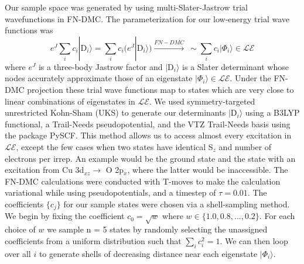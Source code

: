 \documentclass[12pt]{article}
\begin{document}
Our sample space was generated by using multi-Slater-Jastrow trial wavefunctions in FN-DMC.
The parameterization for our low-energy trial wave functions was
\begin{equation}
e^{J}\sum_{i} c_i|\text{D}_i\rangle = \sum_{i} c_i (e^J |\text{D}_i \rangle) \xrightarrow{FN-DMC} \ \sim \sum_i c_i |\Phi_i \rangle \in \mathcal{LE}
\label{eq:sampling}
\end{equation}
where $e^J$ is a three-body Jastrow factor and $|\text{D}_i\rangle$ is a Slater determinant whose nodes accurately approximate those of an eigenstate $|\Phi_i \rangle \in \mathcal{LE}$.
Under the FN-DMC projection these trial wave functions map to states which are very close to linear combinations of eigenstates in $\mathcal{LE}$.
We used symmetry-targeted unrestricted Kohn-Sham (UKS) to generate our determinants $|\text{D}_i\rangle$ using a B3LYP functional, a Trail-Needs pseudopotential, and the VTZ Trail-Needs basis using the package PySCF.
This method allows us to access almost every excitation in $\mathcal{LE}$, except the few cases when two states have identical S$_z$ and number of electrons per irrep.
An example would be the ground state and the state with an excitation from Cu 3d$_{xz} \rightarrow $  O 2p$_x$, where the latter would be inaccessible.
The FN-DMC calculations were conducted with T-moves to make the calculation variational while using pseudopotentials, and a timestep of $\tau = 0.01$.
The coefficients $\{c_j\}$ for our sample states were chosen via a shell-sampling method. 
We begin by fixing the coefficient $c_0 = \sqrt{w}$ where $w \in \{1.0, 0.8,..., 0.2\}$. 
For each choice of $w$ we sample n = 5 states by randomly selecting the unassigned coefficients from a uniform distribution such that $\sum_i c_i^2 = 1$. 
We can then loop over all $i$ to generate shells of decreasing distance near each eigenstate $|\Phi_i\rangle$.
\end{document}
